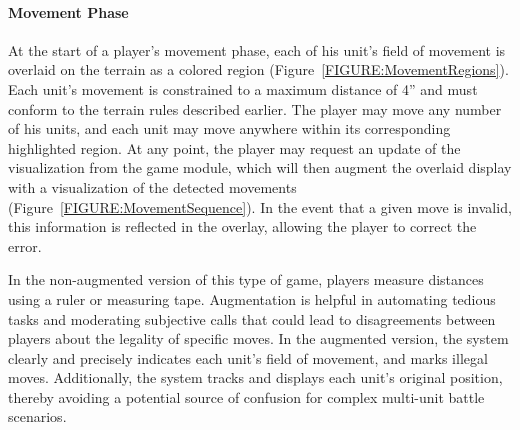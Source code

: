 \documentclass[10pt,twocolumn,letterpaper]{article}
\begin{document}
\vspace{-0.15in}
\paragraph{Movement Phase}

At the start of a player's movement phase, each of his unit's field of
movement is overlaid on the terrain as a colored region
(Figure~\ref{FIGURE:MovementRegions}).  Each unit's movement is
constrained to a maximum distance of 4'' and must conform to the
terrain rules described earlier.  The player may move any number of
his units, and each unit may move anywhere within its corresponding
highlighted region.
%
At any point,
the player may request an update of the
visualization from the game module, which will then augment the
overlaid display with a visualization of the detected movements
(Figure~\ref{FIGURE:MovementSequence}).
In the event that a given move is invalid, this information is
reflected in the overlay, allowing the player to correct the error.


%
In the %
non-augmented version of this type of  game,
players measure distances using a ruler or measuring tape.
%
Augmentation is helpful
in automating tedious tasks
and moderating subjective calls that could lead to disagreements
between players about the legality of specific moves.  In the
augmented version,
the system 
clearly and precisely indicates each unit's field of movement, and
marks illegal moves.
Additionally, 
the system tracks and displays each unit's original position,
thereby avoiding a potential source of
confusion for complex multi-unit battle scenarios.
\end{document}

